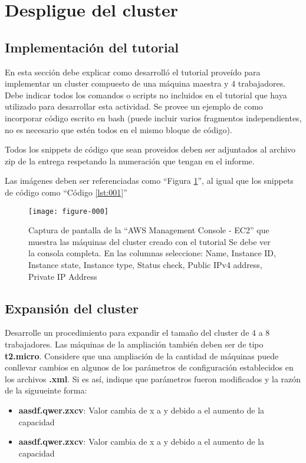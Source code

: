 \documentclass[12pt,letterpaper,twoside]{article}
\begin{document}
\section{Despligue del cluster}

\subsection{Implementación del tutorial}

{\color{red} En esta sección debe explicar como desarrolló el tutorial proveído para implementar un cluster compuesto de una máquina maestra y 4 trabajadores. Debe indicar todos los comandos o scripts no incluidos en el tutorial que haya utilizado para desarrollar esta actividad. Se provee un ejemplo de como incorporar código escrito en bash (puede incluir varios fragmentos independientes, no es necesario que estén todos en el mismo bloque de código).}

{\color{red} Todos los snippets de código que sean proveidos deben ser adjuntados al archivo zip de la entrega respetando la numeración que tengan en el informe.}

{\color{red} Las imágenes deben ser referenciadas como ``Figura \ref{fig:001}'', al igual que los snippets de código como ``Código \ref{lst:001}''}

\begin{code}[H]

\end{code}

\begin{figure}
    \centering
    \texttt{[image: figure-000]}
    \caption{Captura de pantalla de la ``AWS Management Console - EC2'' que muestra las máquinas del cluster creado con el tutorial
    {\color{red} Se debe ver la consola completa. En las columnas seleccione: Name, Instance ID, Instance state, Instance type, Status check, Public IPv4 address, Private IP Address}}
    \label{fig:001}
\end{figure}

\subsection{Expansión del cluster}

{\color{red} Desarrolle un procedimiento para expandir el tamaño del cluster de 4 a 8 trabajadores. Las máquinas de la ampliación también deben ser de tipo \textbf{t2.micro}. Considere que una ampliación de la cantidad de máquinas puede conllevar cambios en algunos de los parámetros de configuración establecidos en los archivos \textbf{.xml}. Si es así, indique que parámetros fueron modificados y la razón de la siguueinte forma:
\begin{itemize}
    \item \textbf{aasdf.qwer.zxcv}: Valor cambia de x a y debido a el aumento de la capacidad
    \item \textbf{aasdf.qwer.zxcv}: Valor cambia de x a y debido a el aumento de la capacidad
\end{itemize}
}
\end{document}
